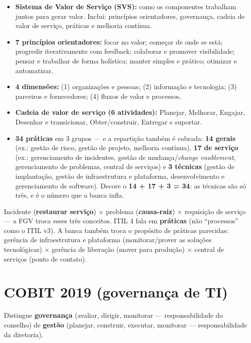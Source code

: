 \begin{itemize}
\item \textbf{Sistema de Valor de Serviço (SVS):} como os componentes
trabalham juntos para gerar valor. Inclui: princípios orientadores,
governança, cadeia de valor de serviço, práticas e melhoria contínua.
\item \textbf{7 princípios orientadores:} focar no valor; começar de onde
se está; progredir iterativamente com feedback; colaborar e promover
visibilidade; pensar e trabalhar de forma holística; manter simples e
prático; otimizar e automatizar.
\item \textbf{4 dimensões:} (1) organizações e pessoas; (2) informação e
tecnologia; (3) parceiros e fornecedores; (4) fluxos de valor e processos.
\item \textbf{Cadeia de valor de serviço (6 atividades):} Planejar,
Melhorar, Engajar, Desenhar e transicionar, Obter/construir, Entregar e
suportar.
\item \textbf{34 práticas} em 3 grupos --- e a repartição também é cobrada:
\textbf{14 gerais} (ex.: gestão de risco, gestão de projeto, melhoria
contínua), \textbf{17 de serviço} (ex.: gerenciamento de incidentes, gestão de
mudança/\textit{change enablement}, gerenciamento de problemas, central de
serviços) e \textbf{3 técnicas} (gestão de implantação, gestão de
infraestrutura e plataforma, desenvolvimento e gerenciamento de software).
Decore o \textbf{14 + 17 + 3 = 34}: as técnicas são só três, e é o número que
a banca infla.
\end{itemize}

\begin{pegadinha}
Incidente (\textbf{restaurar serviço}) $\times$ problema (\textbf{causa-raiz})
$\times$ requisição de serviço --- a FGV troca esses três conceitos. ITIL 4
fala em \textbf{práticas} (não ``processos'' como o ITIL v3). A banca também
troca o propósito de práticas parecidas: gerência de infraestrutura e
plataforma (monitorar/prover as soluções tecnológicas) $\times$ gerência de
liberação (mover para produção) $\times$ central de serviços (ponto de
contato).
\end{pegadinha}

\section{COBIT 2019 (governança de TI)}

Distingue \textbf{governança} (avaliar, dirigir, monitorar --- responsabilidade
do conselho) de \textbf{gestão} (planejar, construir, executar, monitorar ---
responsabilidade da diretoria).

